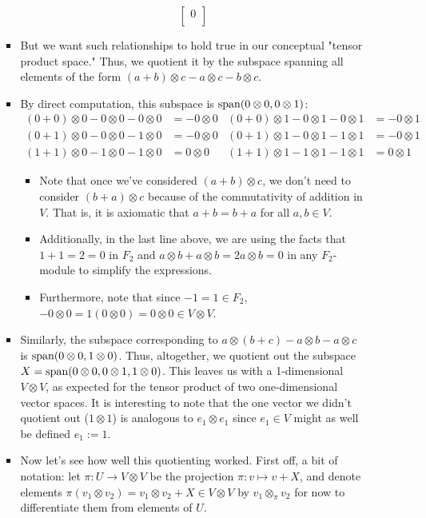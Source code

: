 \documentclass[../notes.tex]{subfiles}
\begin{document}
\begin{itemize}
\begin{itemize}
\begin{itemize}
\begin{equation*}
\begin{bmatrix}
                    0\\
                \end{bmatrix}
            \end{equation*}
            \item But we want such relationships to hold true in our conceptual "tensor product space." Thus, we quotient it by the subspace spanning all elements of the form $(a+b)\otimes c-a\otimes c-b\otimes c$.
            \item By direct computation, this subspace is $\operatorname{span}(0\otimes 0,0\otimes 1)$:
            \begin{align*}
                (0+0)\otimes 0-0\otimes 0-0\otimes 0 &= -0\otimes 0&
                    (0+0)\otimes 1-0\otimes 1-0\otimes 1 &= -0\otimes 1\\
                (0+1)\otimes 0-0\otimes 0-1\otimes 0 &= -0\otimes 0&
                    (0+1)\otimes 1-0\otimes 1-1\otimes 1 &= -0\otimes 1\\
                (1+1)\otimes 0-1\otimes 0-1\otimes 0 &= 0\otimes 0&
                    (1+1)\otimes 1-1\otimes 1-1\otimes 1 &= 0\otimes 1
            \end{align*}
            \begin{itemize}
                \item Note that once we've considered $(a+b)\otimes c$, we don't need to consider $(b+a)\otimes c$ because of the commutativity of addition in $V$. That is, it is axiomatic that $a+b=b+a$ for all $a,b\in V$.
                \item Additionally, in the last line above, we are using the facts that $1+1=2=0$ in $F_2$ and $a\otimes b+a\otimes b=2a\otimes b=0$ in any $F_2$-module to simplify the expressions.
                \item Furthermore, note that since $-1=1\in F_2$, $-0\otimes 0=1(0\otimes 0)=0\otimes 0\in V\otimes V$.
            \end{itemize}
            \item Similarly, the subspace corresponding to $a\otimes(b+c)-a\otimes b-a\otimes c$ is $\operatorname{span}(0\otimes 0,1\otimes 0)$. Thus, altogether, we quotient out the subspace $X=\operatorname{span}(0\otimes 0,0\otimes 1,1\otimes 0)$. This leaves us with a 1-dimensional $V\otimes V$, as expected for the tensor product of two one-dimensional vector spaces. It is interesting to note that the one vector we didn't quotient out ($1\otimes 1$) is analogous to $e_1\otimes e_1$ since $e_1\in V$ might as well be defined $e_1:=1$.
            \item Now let's see how well this quotienting worked. First off, a bit of notation: let $\pi:U\to V\otimes V$ be the projection $\pi:v\mapsto v+X$, and denote elements $\pi(v_1\otimes v_2)=v_1\otimes v_2+X\in V\otimes V$ by $v_1\otimes_\pi v_2$ for now to differentiate them from elements of $U$.

\end{itemize}
\end{itemize}
\end{itemize}
\end{document}
